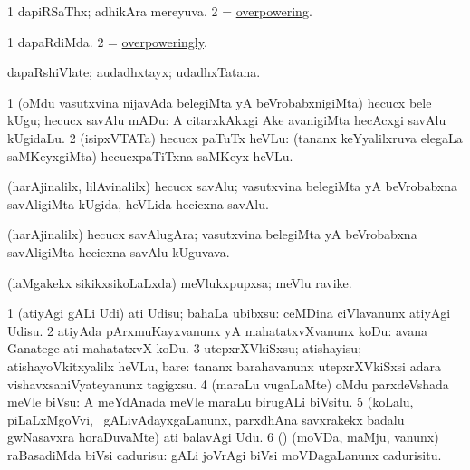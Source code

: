 \bentry
{}
\gl{\gu}
\bmng
\bnum
\num{1} dapiRSaThx; adhikAra mereyuva. 
\num{2} = \hyperlink{overpowering}{overpowering}. 
\enum
\emng
\eentry

\bentry
{}
\gl{\kirxvi}
\bmng
\bnum
\num{1} dapaRdiMda. 
\num{2} = \hyperlink{overpoweringly}{overpoweringly}. 
\enum
\emng
\eentry

\bentry
{}
\gl{\nA}
\bmng
dapaRshiVlate; audadhxtayx; udadhxTatana. 
\emng
\eentry

\bentry
{}
\gl{\sakirx}
\bmng
\bnum
\num{1} (oMdu vasutxvina nijavAda belegiMta yA beVrobabxnigiMta) hecucx bele kUgu; hecucx savAlu mADu:  A citarxkAkxgi Ake avanigiMta hecAcxgi savAlu kUgidaLu. 
\num{2} (isipxVTATa) hecucx paTuTx heVLu:  (tananx keYyalilxruva elegaLa saMKeyxgiMta) hecucxpaTiTxna saMKeyx heVLu. 
\enum
\emng
\eentry

\bentry
{}
\gl{\nA}
\bmng
(harAjinalilx, lilAvinalilx) hecucx savAlu; vasutxvina belegiMta yA beVrobabxna savAligiMta kUgida, heVLida hecicxna savAlu. 
\emng
\eentry

\bentry
{}
\gl{\nA}
\bmng
(harAjinalilx) hecucx savAlugAra; vasutxvina belegiMta yA beVrobabxna savAligiMta hecicxna savAlu kUguvava. 
\emng
\eentry

\bentry
{}
\gl{\nA}
\bmng
(laMgakekx sikikxsikoLaLxda) meVlukxpupxsa; meVlu ravike. 
\emng
\eentry

\bentry
{}
\gl{\sakirx}
\bmng
\bnum
\num{1} (atiyAgi gALi Udi) ati Udisu; bahaLa ubibxsu:  ceMDina ciVlavanunx atiyAgi Udisu. 
\num{2} atiyAda pArxmuKayxvanunx yA mahatatxvXvanunx koDu:  avana Ganatege ati mahatatxvX koDu. 
\num{3} utepxrXVkiSxsu; atishayisu; atishayoVkitxyalilx heVLu, bare:  tananx barahavanunx utepxrXVkiSxsi adara vishavxsaniVyateyanunx tagigxsu. 
\num{4} (maraLu \mo vugaLaMte) oMdu parxdeVshada meVle biVsu:  A meYdAnada meVle maraLu birugALi biVsitu. 
\num{5} (koLalu, piLaLxMgoVvi, \mo\ gALivAdayxgaLanunx, parxdhAna savxrakekx badalu gwNasavxra horaDuvaMte) ati balavAgi Udu. 
\num{6} (\pArxparx) (moVDa, maMju, \mo vanunx) raBasadiMda biVsi cadurisu:  gALi joVrAgi biVsi moVDagaLanunx cadurisitu. 
\enum
\emng
\eentry


